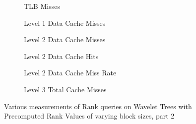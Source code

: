 \begin{figure}\tiny
\begin{subfigure}{0.48\textwidth}
	
	\caption{TLB Misses}
	\label{fig:PrecomputedRankBlockSize_Rank_TLB}
\end{subfigure}
\hfill
\begin{subfigure}{0.48\textwidth}
	
	\caption{Level 1 Data Cache Misses}
	\label{fig:PrecomputedRankBlockSize_Rank_L1CacheMiss}
\end{subfigure}
\begin{subfigure}{0.48\textwidth}
	
	\caption{Level 2 Data Cache Misses}
	\label{fig:PrecomputedRankBlockSize_Rank_L2CacheMiss}
\end{subfigure}
\hfill
\begin{subfigure}{0.48\textwidth}
	
	\caption{Level 2 Data Cache Hits}
	\label{fig:PrecomputedRankBlockSize_Rank_L2CacheHits}
\end{subfigure}
\begin{subfigure}{0.48\textwidth}
	
	\caption{Level 2 Data Cache Miss Rate}
	\label{fig:PrecomputedRankBlockSize_Rank_L2CacheMissRate}
\end{subfigure}
\hfill
\begin{subfigure}{0.48\textwidth}
	
	\caption{Level 3 Total Cache Misses}
	\label{fig:PrecomputedRankBlockSize_Select_L3CacheMiss}
\end{subfigure}

\caption{Various measurements of Rank queries on Wavelet Trees with Precomputed Rank Values of varying block sizes, part 2}
\label{fig:PrecomputedRankBlockSize_Rank2}
\end{figure}






